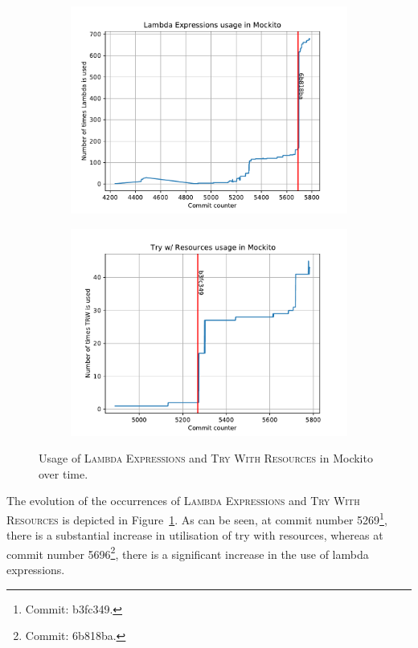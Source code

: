 \begin{figure}[H]
\begin{subfigure}{.5\columnwidth}
  \centering
  \includegraphics[width=1.\linewidth]{papers/jfeature/img/lambda_count.pdf}
\end{subfigure}%
\begin{subfigure}{.5\columnwidth}
  \centering
  \includegraphics[width=1.\linewidth]{papers/jfeature/img/TWR_count.pdf}
\end{subfigure}%
\caption{\label{lbl:mockito} Usage of \textsc{Lambda Expressions} and \textsc{Try With Resources} in Mockito over time.}
\end{figure}
The evolution of the occurrences of \textsc{Lambda Expressions} and \textsc{Try With Resources} is depicted in Figure~\ref{lbl:mockito}. As can be seen, at commit number 5269\footnote{Commit: b3fc349.}, there is a substantial increase in utilisation of try with resources, whereas at commit number 5696\footnote{Commit: 6b818ba.}, there is a significant increase in the use of lambda expressions.

